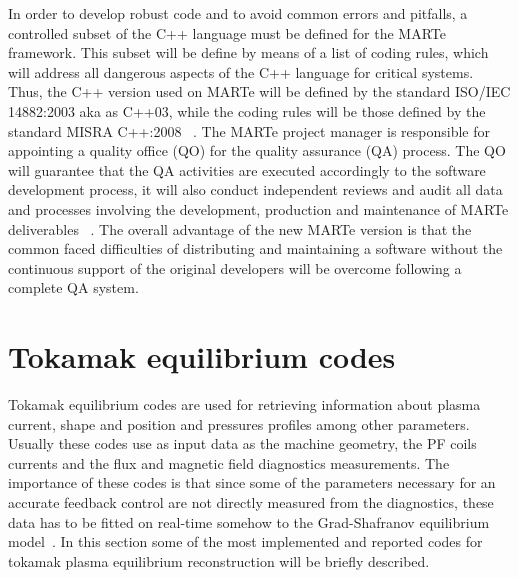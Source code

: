 In order to develop robust code and to avoid common errors and pitfalls, a controlled subset of the C++ language must be defined for the MARTe framework. This subset will be define by means of a list of coding rules, which will address all dangerous aspects of the C++ language for critical systems. Thus, the C++ version used on MARTe will be defined by the standard ISO/IEC 14882:2003 aka as C++03, while the coding rules will be those defined by the standard MISRA C++:2008 ~\cite{MARTe2Code}. The MARTe project manager is responsible for appointing a quality office (QO) for the quality assurance (QA) process. The QO will guarantee that the QA activities are executed accordingly to the software development process, it will also conduct independent reviews and audit all data and processes involving the development, production and maintenance of MARTe deliverables ~\cite{MARTe2QAP}. The overall advantage of the new MARTe version is that the common faced difficulties of distributing and maintaining a software without  the continuous support of the original developers will be overcome following a complete QA system.



\section{Tokamak equilibrium codes} 

Tokamak equilibrium codes are used for retrieving information about plasma current, shape and position and pressures profiles among other parameters. Usually these codes use as input data as the machine geometry, the PF coils currents and the flux and magnetic field diagnostics measurements. The importance of these codes is that since some of the parameters necessary for an accurate feedback control are not directly measured from the diagnostics,  these data has to be fitted on real-time somehow to the Grad-Shafranov equilibrium model~\cite{Shafranov1971}. In this section some of the most implemented and reported codes for tokamak plasma equilibrium reconstruction will be briefly  described.
\smallskip 


